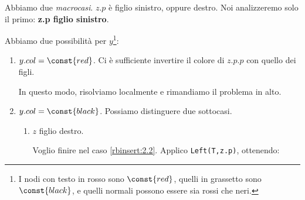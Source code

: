 Abbiamo due \emph{macrocasi}. $z.p$ è figlio sinistro, oppure destro. Noi analizzeremo solo il primo: \textbf{z.p figlio sinistro}.
\begin{center}
\end{center}
\clearpage
Abbiamo due possibilità per $y$\footnote{I nodi con testo in rosso sono $\const{red}$, %
quelli in grassetto sono $\const{black}$, e quelli normali possono essere sia rossi che neri.}:
\begin{enumerate}
    \item $y.col = \const{red}$. Ci è sufficiente invertire il colore di $z.p.p$ con quello dei figli.
    \begin{center}
    \end{center}
    In questo modo, risolviamo localmente e rimandiamo il problema in alto.
    \item $y.col = \const{black}$. Possiamo distinguere due sottocasi.
    \begin{enumerate}[label=($2.\arabic*$)]
        \item $z$ figlio destro. \label{rbinsert:2.1}
        \begin{center}
        \end{center}
        Voglio finire nel caso \ref{rbinsert:2.2}. Applico \texttt{Left(T,z.p)}, ottenendo:
        \begin{center}
        \end{center}


\end{enumerate}
\end{enumerate}
